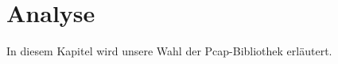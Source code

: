 \chapter{Analyse}
\label{chap:Analyse}

In diesem Kapitel wird unsere Wahl der Pcap-Bibliothek erläutert.

